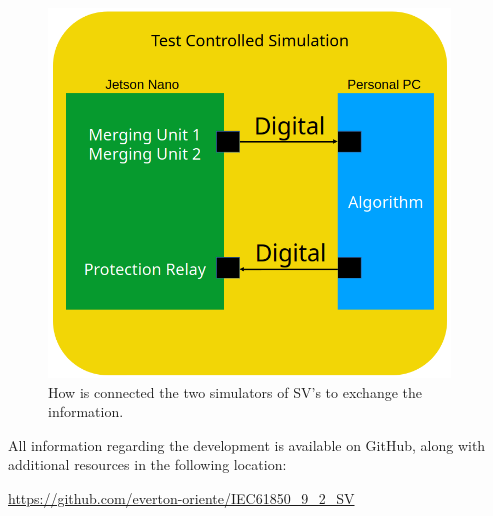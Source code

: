 \begin{figure}[tbh!]
	\centering
	\includegraphics[width=0.95\textwidth, keepaspectratio]{ch4/assets/test_setup.png}
	\caption{How is connected the two simulators of SV's to exchange the information.}
	\label{fig:test_setup}
\end{figure}

All information regarding the development is available on GitHub, along with additional resources in the following location:

\hspace{1cm} \url{https://github.com/everton-oriente/IEC61850_9_2_SV}



